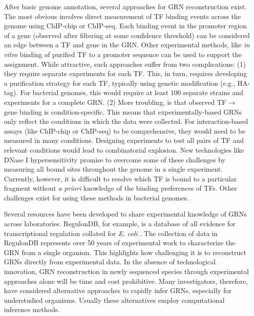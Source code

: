 After basic genome annotation, several approaches for GRN reconstruction exist. The most obvious involves direct measurement of TF binding events across the genome using ChIP-chip or ChIP-seq. Each binding event in the promoter region of a gene (observed after filtering at some confidence threshold) can be considered an edge between a TF and gene in the GRN. Other experimental methods, like \textit{in vitro} binding of purified TF to a promoter  sequence can be used to support the assignment. While attractive, such approaches suffer from two complications: (1) they require separate experiments for each TF. This, in turn, requires developing a purification strategy for each TF, typically using genetic modification (e.g., HA-tag). For bacterial genomes, this would require at least 100 separate strains and experiments for a complete GRN. (2) More troubling, is that observed TF$\rightarrow$gene binding is condition-specific. This means that experimentally-based GRNs only reflect the conditions in which the data were collected. For interaction-based assays (like ChIP-chip or ChIP-seq) to be comprehensive, they would need to be measured in many conditions. Designing experiments to test all pairs of TF and relevant conditions would lead to combinatorial explosion. New technologies like DNase I hypersensitivity \cite{crawford_identifying_2004} promise to overcome some of these challenges by measuring all bound sites throughout the genome in a single experiment. Currently, however, it is difficult to resolve which TF is bound to a particular fragment without \textit{a priori} knowledge of the binding preferences of TFs. Other challenges exist for using these methods in bacterial genomes. 

Several resources have been developed to share experimental knowledge of GRNs across laboratories. RegulonDB, for example, is a database of all evidence for transcriptional regulation collated for \textit{E. coli} \cite{salgado_regulondb_2006}. The collection of data in RegulonDB represents over 50 years of experimental work to characterize the GRN from a single organism. This highlights how challenging it is to reconstruct GRNs directly from experimental data. In the absence of technological innovation, GRN reconstruction in newly sequenced species through experimental approaches alone will be time and cost prohibitive. Many investigators, therefore, have considered alternative approaches to rapidly infer GRNs, especially for understudied organisms. Usually these alternatives employ computational inference methods. 

